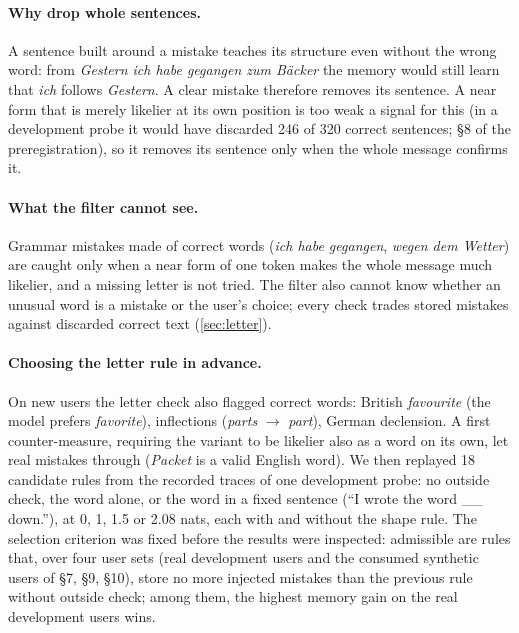 \documentclass[10pt,twocolumn]{article}
\begin{document}
\paragraph{Why drop whole sentences.} A sentence built around a mistake teaches its structure even without the wrong
word: from \emph{Gestern ich habe gegangen zum B\"acker} the memory would still learn that \emph{ich} follows
\emph{Gestern}. A clear mistake therefore removes its sentence. A near form that is merely likelier at its own position
is too weak a signal for this (in a development probe it would have discarded 246 of 320 correct sentences; \S8 of the
preregistration), so it removes its sentence only when the whole message confirms it.

\paragraph{What the filter cannot see.} Grammar mistakes made of correct words (\emph{ich habe gegangen},
\emph{wegen dem Wetter}) are caught only when a near form of one token makes the whole message much likelier, and a
missing letter is not tried. The filter also cannot know whether an unusual word is a mistake or the user's choice;
every check trades stored mistakes against discarded correct text (\cref{sec:letter}).

\paragraph{Choosing the letter rule in advance.} On new users the letter check also flagged correct words: British
\emph{favourite} (the model prefers \emph{favorite}), inflections (\emph{parts} $\to$ \emph{part}), German declension. A
first counter-measure, requiring the variant to be likelier also as a word on its own, let real mistakes through
(\emph{Packet} is a valid English word). We then replayed 18 candidate rules from the recorded traces of one development
probe: no outside check, the word alone, or the word in a fixed sentence (``I wrote the word \_\_ down.''), at 0, 1, 1.5
or 2.08 nats, each with and without the shape rule. The selection criterion was fixed before the results were
inspected: admissible are rules that, over four user sets (real development users and the consumed synthetic users of
\S7, \S9, \S10), store no more injected mistakes than the previous rule without outside check; among them, the highest
memory gain on the real development users wins.

\end{document}
